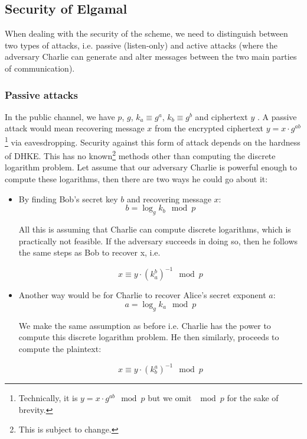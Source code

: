 \subsection{Security of Elgamal}

When dealing with the security of the scheme, we need to distinguish between two types of attacks, i.e. passive (listen-only) and active attacks (where the adversary Charlie can generate and alter messages between the two main parties of communication).

\subsubsection{Passive attacks}

In the public channel, we have \( p \), \( g \), \( k_a \equiv g^a \), \( k_b \equiv g^b \) and ciphertext \( y \) . A passive attack would mean recovering message \( x \) from the encrypted ciphertext \( y = x \cdot g^{ab} \)\textsuperscript{   }\footnote{Technically, it is \( y = x \cdot g^{ab} \mod p \) but we omit \( \mod p \) for the sake of brevity.} via eavesdropping.
Security against this form of attack depends on the hardness of DHKE. 
This has no known\footnote{This is subject to change.} methods other than computing the discrete logarithm problem.
Let assume that our adversary Charlie is powerful enough to compute these logarithms, then there are two ways he could go about it:

\begin{itemize}
    \item By finding Bob's secret key \( b \) and recovering message \( x \):
        \begin{equation}
            b = \log_g k_b \mod p
        \end{equation}

        All this is assuming that Charlie can compute discrete logarithms, which is practically not feasible. 
        If the adversary succeeds in doing so, then he follows the same steps as Bob to recover x, i.e.

        \begin{equation}
            x \equiv y \cdot (k_a^b)^{-1} \mod p
        \end{equation}
        
    \item Another way would be for Charlie to recover Alice's secret exponent \( a \):
        \begin{equation}
            a = \log_g k_a \mod p
        \end{equation}
        
        We make the same assumption as before i.e. Charlie has the power to compute this discrete logarithm problem.
        He then similarly, proceeds to compute the plaintext:

        \begin{equation}
            x \equiv y \cdot (k_b^a)^{-1} \mod p     
        \end{equation}
\end{itemize}

